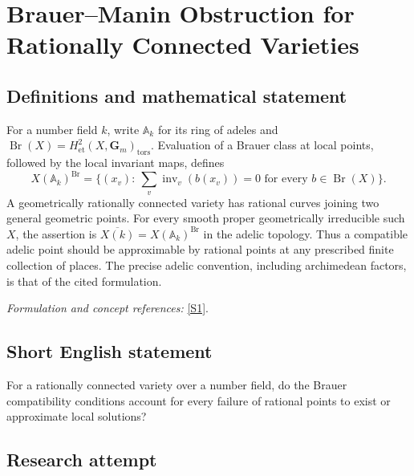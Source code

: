 \documentclass[11pt]{article}
\newcommand{\A}{\mathbb{A}}
\newcommand{\sref}[2]{\hyperlink{source:#1:#2}{[S#2]}}
\newif\ifshowcatalogue
\newcommand{\cataloguescope}[1]{\ifshowcatalogue
 \paragraph{Exact scope in the supplied catalogue.}
 \begin{quote}\small #1\end{quote}\fi}
\begin{document}
\setcounter{section}{0}
\clearpage
\section*{\texorpdfstring{Brauer–Manin Obstruction for Rationally Connected Varieties}{Brauer–Manin Obstruction for Rationally Connected Varieties}}\label{30003827}
\subsection{Definitions and mathematical statement}
For a number field $k$, write $\A_k$ for its ring of adeles and $\operatorname{Br}(X)=H^2_{\mathrm{et}}(X,\mathbf G_m)_{\mathrm{tors}}$. Evaluation of a Brauer class at local points, followed by the local invariant maps, defines
\[
 X(\A_k)^{\operatorname{Br}}=\{(x_v):\ \sum_v\operatorname{inv}_v(b(x_v))=0\text{ for every }b\in\operatorname{Br}(X)\}.
\]
A geometrically rationally connected variety has rational curves joining two general geometric points. For every smooth proper geometrically irreducible such $X$, the assertion is
$\overline{X(k)}=X(\A_k)^{\operatorname{Br}}$ in the adelic topology. Thus a compatible adelic point should be approximable by rational points at any prescribed finite collection of places. The precise adelic convention, including archimedean factors, is that of the cited formulation.
\par\smallskip\textit{Formulation and concept references:} \sref{30003827}{1}.
\cataloguescope{Let X be a smooth, proper, geometrically irreducible variety over a number field k whose base change to an algebraic closure is rationally connected. Prove that X(k) is dense in the Brauer-Manin set X(A\_k)\textasciicircum{}\{Br(X)\}; in particular the Brauer-Manin obstruction is the only obstruction to the Hasse principle and weak approximation for such varieties.}
\subsection{Short English statement}
For a rationally connected variety over a number field, do the Brauer compatibility conditions account for every failure of rational points to exist or approximate local solutions?
\subsection{Research attempt}
\end{document}
